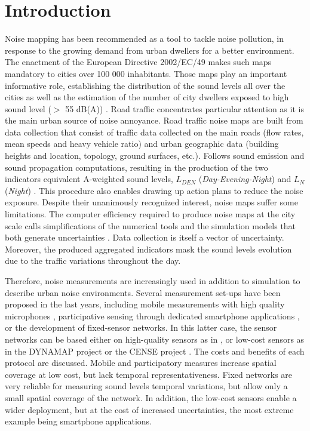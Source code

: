\documentclass[review,5p,twocolumn,sort&compress,times]{elsarticle}
\begin{document}
\linenumbers

\section{Introduction}

Noise mapping has been recommended as a tool to tackle noise pollution, in response to the growing demand from urban dwellers for a better environment. The enactment of the European Directive 2002/EC/49 makes such maps mandatory to cities over 100 000 inhabitants. Those maps play an important informative role, establishing the distribution of the sound levels all over the cities as well as the estimation of the number of city dwellers exposed to high sound level ($>$ 55 dB(A)) \cite{nugent2014noise}. Road traffic concentrates particular attention as it is the main urban source of noise annoyance. Road traffic noise maps are built from data collection that consist of traffic data collected on the main roads (flow rates, mean speeds and heavy vehicle ratio) and urban geographic data (building heights and location, topology, ground surfaces, etc.). Follows sound emission and sound propagation computations, resulting in the production of the two indicators equivalent A-weighted sound levels, $L_{DEN}$ (\textit{Day-Evening-Night}) and $L_N$ (\textit{Night}) \cite{kephalopoulos2012common}. This procedure also enables drawing up action plans to reduce the noise exposure. Despite their unanimously recognized interest, noise maps suffer some limitations. The computer efficiency required to produce noise maps at the city scale calls simplifications of the numerical tools and the simulation models that both generate uncertainties \cite{van_leeuwen_noise_2015}. Data collection is itself a vector of uncertainty. Moreover, the produced aggregated indicators mask the sound levels evolution due to the traffic variations throughout the day.

Therefore, noise measurements are increasingly used in addition to simulation to describe urban noise environments. Several measurement set-ups have been proposed in the last years, including  mobile measurements with high quality microphones \cite{manvell2004sadmam, can2014measurement}, participative sensing through dedicated smartphone applications \cite{picaut:halshs-01565214, ventura2017evaluation}, or the development of fixed-sensor networks. In this latter case, the sensor networks can be based either on high-quality sensors as in \cite{mietlicki2012innovative, maijala2018environmental}, or low-cost sensors as in the DYNAMAP project \cite{dynamap_2016} or the CENSE project \cite{picaut2017characterization}. The costs and benefits of each protocol are discussed. Mobile and participatory measures increase spatial coverage at low cost, but lack temporal representativeness. Fixed networks are very reliable for measuring sound levels temporal variations, but allow only a small spatial coverage of the network. In addition, the low-cost sensors enable a wider deployment, but at the cost of increased uncertainties, the most extreme example being smartphone applications.
\end{document}
